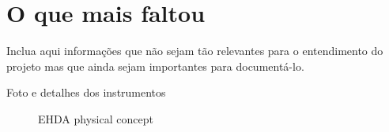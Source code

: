 \chapter{O que mais faltou}

Inclua aqui informações que não sejam tão relevantes para o entendimento do projeto mas que ainda sejam importantes para documentá-lo. 


Foto e detalhes dos instrumentos

\begin{figure}[H]
    \centering
    \caption{EHDA physical concept }
\end{figure}



